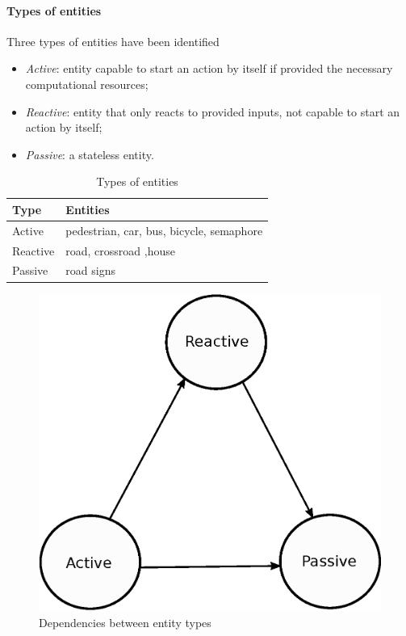 \paragraph{Types of entities}
Three types of entities have been identified
\begin{itemize}
  \item \textit{Active}: entity capable to start an action by itself if provided 
the necessary computational resources;
  \item \textit{Reactive}: entity that only reacts to provided inputs, 
not capable to start an action by itself;
  \item \textit{Passive}: a stateless entity.
\end{itemize}
\begin{table}[H]
\centering
\begin{tabular}{|l|l|}
\hline
\rowcolor{BlueGreen}
Type     & Entities                                 \\ \hline
Active   & pedestrian, car, bus, bicycle, semaphore \\ \hline
Reactive & road, crossroad ,house                   \\ \hline
Passive  & road signs                               \\ \hline
\end{tabular}
\caption{Types of entities}
\label{tab:entity_type}
\end{table}

\begin{figure}[H]
  \centering
  \includegraphics[width=.35\columnwidth]{sections/images/solution/entity_type_dependency.eps}
  \caption{Dependencies between entity types}
  \label{fig:sd-entity-types-deps}
\end{figure}
